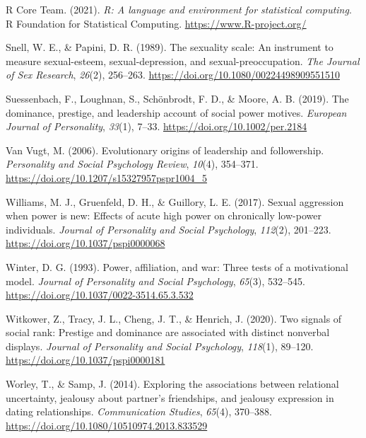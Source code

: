 \documentclass[
  english,
  a4paper,floatsintext]{apa7}
\newlength{\cslhangindent}
\newlength{\cslentryspacingunit} %
\newenvironment{CSLReferences}[2] %
 {%
  \setlength{\parindent}{0pt}
  \ifodd #1
  \let\oldpar\par
  \def\par{\hangindent=\cslhangindent\oldpar}
  \fi
  \setlength{\parskip}{#2\cslentryspacingunit}
 }%
 {}
\begin{document}
\begin{CSLReferences}{1}{0}
\leavevmode{}%
R Core Team. (2021). \emph{R: A language and environment for statistical computing}. R Foundation for Statistical Computing. \url{https://www.R-project.org/}

\leavevmode{}%
Snell, W. E., \& Papini, D. R. (1989). The sexuality scale: An instrument to measure sexual-esteem, sexual-depression, and sexual-preoccupation. \emph{The Journal of Sex Research}, \emph{26}(2), 256--263. \url{https://doi.org/10.1080/00224498909551510}

\leavevmode{}%
Suessenbach, F., Loughnan, S., Schönbrodt, F. D., \& Moore, A. B. (2019). The dominance, prestige, and leadership account of social power motives. \emph{European Journal of Personality}, \emph{33}(1), 7--33. \url{https://doi.org/10.1002/per.2184}

\leavevmode{}%
Van Vugt, M. (2006). Evolutionary origins of leadership and followership. \emph{Personality and Social Psychology Review}, \emph{10}(4), 354--371. \url{https://doi.org/10.1207/s15327957pspr1004_5}

\leavevmode{}%
Williams, M. J., Gruenfeld, D. H., \& Guillory, L. E. (2017). Sexual aggression when power is new: Effects of acute high power on chronically low-power individuals. \emph{Journal of Personality and Social Psychology}, \emph{112}(2), 201--223. \url{https://doi.org/10.1037/pspi0000068}

\leavevmode{}%
Winter, D. G. (1993). Power, affiliation, and war: Three tests of a motivational model. \emph{Journal of Personality and Social Psychology}, \emph{65}(3), 532--545. \url{https://doi.org/10.1037/0022-3514.65.3.532}

\leavevmode{}%
Witkower, Z., Tracy, J. L., Cheng, J. T., \& Henrich, J. (2020). Two signals of social rank: Prestige and dominance are associated with distinct nonverbal displays. \emph{Journal of Personality and Social Psychology}, \emph{118}(1), 89--120. \url{https://doi.org/10.1037/pspi0000181}

\leavevmode{}%
Worley, T., \& Samp, J. (2014). Exploring the associations between relational uncertainty, jealousy about partner's friendships, and jealousy expression in dating relationships. \emph{Communication Studies}, \emph{65}(4), 370--388. \url{https://doi.org/10.1080/10510974.2013.833529}

\end{CSLReferences}
\end{document}
